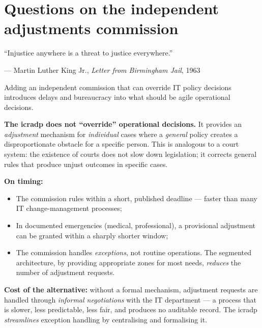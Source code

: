 \section{Questions on the independent adjustments commission}
\label{sec:q-iac}

\epigraph{``Injustice anywhere is a threat to justice everywhere.''}{--- Martin Luther King Jr., \textit{Letter from Birmingham Jail}, 1963}

\begin{questionbox}
Adding an independent commission that can override IT policy decisions introduces delays and bureaucracy into what should be agile operational decisions.
\end{questionbox}

\begin{answerbox}[Answer to Q6.1]
\textbf{The \gls{icradp} does not ``override'' operational decisions.} It provides an \emph{adjustment} mechanism for \emph{individual} cases where a \emph{general} policy creates a disproportionate obstacle for a specific person. This is analogous to a court system: the existence of courts does not slow down legislation; it corrects general rules that produce unjust outcomes in specific cases.

\medskip\noindent\textbf{On timing:}
\begin{itemize}[nosep]
    \item The commission rules within a short, published deadline --- faster than many IT change-management processes;
    \item In documented emergencies (medical, professional), a provisional adjustment can be granted within a sharply shorter window;
    \item The commission handles \emph{exceptions}, not routine operations. The segmented architecture, by providing appropriate zones for most needs, \emph{reduces} the number of adjustment requests.
\end{itemize}

\noindent\textbf{Cost of the alternative:} without a formal mechanism, adjustment requests are handled through \emph{informal negotiations} with the IT department --- a process that is slower, less predictable, less fair, and produces no auditable record. The \gls{icradp} \emph{streamlines} exception handling by centralising and formalising it.
\end{answerbox}

